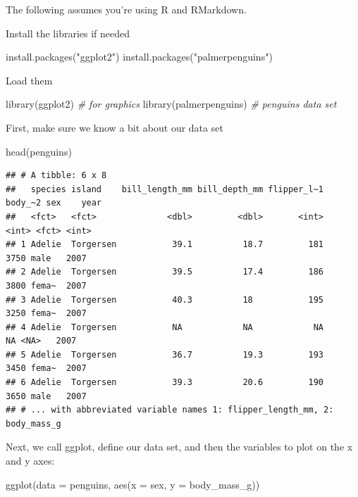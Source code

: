 \documentclass[
]{book}
\newenvironment{Shaded}{\begin{snugshade}}{\end{snugshade}}
\newcommand{\AttributeTok}[1]{\textcolor[rgb]{0.77,0.63,0.00}{#1}}
\newcommand{\CommentTok}[1]{\textcolor[rgb]{0.56,0.35,0.01}{\textit{#1}}}
\newcommand{\FunctionTok}[1]{\textcolor[rgb]{0.00,0.00,0.00}{#1}}
\newcommand{\NormalTok}[1]{#1}
\newcommand{\StringTok}[1]{\textcolor[rgb]{0.31,0.60,0.02}{#1}}
\begin{document}
The following assumes you're using R and RMarkdown.

Install the libraries if needed

\begin{Shaded}
\begin{Highlighting}[]
\FunctionTok{install.packages}\NormalTok{(}\StringTok{"ggplot2"}\NormalTok{)}
\FunctionTok{install.packages}\NormalTok{(}\StringTok{"palmerpenguins"}\NormalTok{)}
\end{Highlighting}
\end{Shaded}

Load them

\begin{Shaded}
\begin{Highlighting}[]
\FunctionTok{library}\NormalTok{(ggplot2) }\CommentTok{\# for graphics}
\FunctionTok{library}\NormalTok{(palmerpenguins) }\CommentTok{\# penguins data set}
\end{Highlighting}
\end{Shaded}

First, make sure we know a bit about our data set

\begin{Shaded}
\begin{Highlighting}[]
\FunctionTok{head}\NormalTok{(penguins)}
\end{Highlighting}
\end{Shaded}

\begin{verbatim}
## # A tibble: 6 x 8
##   species island    bill_length_mm bill_depth_mm flipper_l~1 body_~2 sex    year
##   <fct>   <fct>              <dbl>         <dbl>       <int>   <int> <fct> <int>
## 1 Adelie  Torgersen           39.1          18.7         181    3750 male   2007
## 2 Adelie  Torgersen           39.5          17.4         186    3800 fema~  2007
## 3 Adelie  Torgersen           40.3          18           195    3250 fema~  2007
## 4 Adelie  Torgersen           NA            NA            NA      NA <NA>   2007
## 5 Adelie  Torgersen           36.7          19.3         193    3450 fema~  2007
## 6 Adelie  Torgersen           39.3          20.6         190    3650 male   2007
## # ... with abbreviated variable names 1: flipper_length_mm, 2: body_mass_g
\end{verbatim}

Next, we call ggplot, define our data set, and then the variables to plot on the x and y axes:

\begin{Shaded}
\begin{Highlighting}[]
\FunctionTok{ggplot}\NormalTok{(}\AttributeTok{data =}\NormalTok{ penguins, }\FunctionTok{aes}\NormalTok{(}\AttributeTok{x =}\NormalTok{ sex, }\AttributeTok{y =}\NormalTok{ body\_mass\_g))}
\end{Highlighting}
\end{Shaded}
\end{document}
